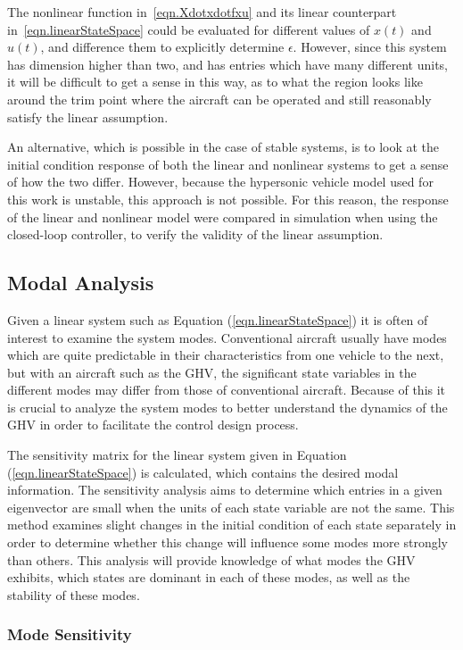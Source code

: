 The nonlinear function in\ \eqref{eqn.Xdotxdotfxu} and its linear counterpart in\ \eqref{eqn.linearStateSpace} could be evaluated for different values of $x(t)$ and $u(t)$, and difference them to explicitly determine $\epsilon$.
However, since this system has dimension higher than two, and has entries which have many different units, it will be difficult to get a sense in this way, as to what the region looks like around the trim point where the aircraft can be operated and still reasonably satisfy the linear assumption.

An alternative, which is possible in the case of stable systems, is to look at the initial condition response of both the linear and nonlinear systems to get a sense of how the two differ.
However, because the hypersonic vehicle model used for this work is unstable, this approach is not possible.
For this reason, the response of the linear and nonlinear model were compared in simulation when using the closed-loop controller, to verify the validity of the linear assumption.

\subsection{Modal Analysis}

Given a linear system such as Equation (\ref{eqn.linearStateSpace}) it is often of interest to examine the system modes.
Conventional aircraft usually have modes which are quite predictable in their characteristics from one vehicle to the next, but with an aircraft such as the GHV, the significant state variables in the different modes may differ from those of conventional aircraft.
Because of this it is crucial to analyze the system modes to better understand the dynamics of the GHV in order to facilitate the control design process.

The sensitivity matrix for the linear system given in Equation (\ref{eqn.linearStateSpace}) is calculated, which contains the desired modal information.
The sensitivity analysis aims to determine which entries in a given eigenvector are small when the units of each state variable are not the same.
This method examines slight changes in the initial condition of each state separately in order to determine whether this change will influence some modes more strongly than others.
This analysis will provide knowledge of what modes the GHV exhibits, which states are dominant in each of these modes, as well as the stability of these modes.

\subsubsection*{Mode Sensitivity} %

